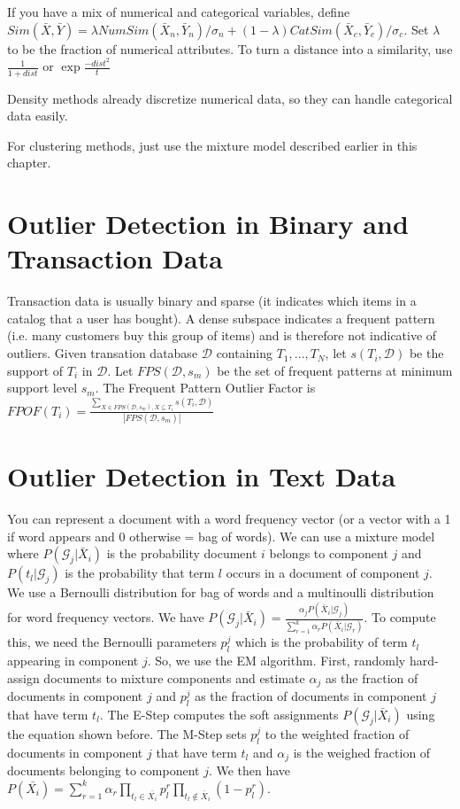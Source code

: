 \documentclass[a4paper]{article}
\begin{document}
If you have a mix of numerical and categorical variables, define
$Sim(\bar{X}, \bar{Y}) = \lambda NumSim(\bar{X}_n, \bar{Y}_n)/\sigma_n +
(1 - \lambda) CatSim(\bar{X}_c, \bar{Y}_c)/\sigma_c$.
Set $\lambda$ to be the fraction of numerical attributes. To turn a distance
into a similarity, use $\frac{1}{1 + dist}$ or $\exp{\frac{-dist^2}{t}}$

Density methods already discretize numerical data, so they can handle
categorical data easily.

For clustering methods, just use the mixture model described earlier in this
chapter.

\section{Outlier Detection in Binary and Transaction Data}
Transaction data is usually binary and sparse (it indicates which items in
a catalog that a user has bought). A dense subspace indicates a frequent
pattern (i.e. many customers buy this group of items) and is therefore not
indicative of outliers. Given transation database $\mathcal{D}$ containing
$T_1, ..., T_N$, let $s(T_i, \mathcal{D})$ be the support of $T_i$ in
$\mathcal{D}$. Let $FPS(\mathcal{D}, s_m)$ be the set of frequent patterns
at minimum support level $s_m$. The Frequent Pattern Outlier Factor is
$FPOF(T_i) = \frac{\sum_{X \in FPS(\mathcal{D}, s_m), X \subseteq T_i}{s(T_i, \mathcal{D})}}{
|FPS(\mathcal{D}, s_m)|}$

\section{Outlier Detection in Text Data}
You can represent a document with a word frequency vector (or a vector with
a 1 if word appears and 0 otherwise = bag of words).
We can use a mixture model where $P(\mathcal{G}_j | \bar{X}_i)$ is the
probability document $i$ belongs to component $j$ and $P(t_l | \mathcal{G}_j)$
is the probability that term $l$ occurs in a document of component $j$. We use
a Bernoulli distribution for bag of words and a multinoulli distribution for
word frequency vectors. We have $P(\mathcal{G}_j | \bar{X}_i) =
\frac{\alpha_j P(\bar{X}_i | \mathcal{G}_j)}{\sum_{r=1}^{k}{\alpha_r
P(\bar{X}_i | \mathcal{G}_r)}}$. To compute this, we need the Bernoulli
parameters $p^j_l$ which is the probability of term $t_l$ appearing in component
$j$. So, we use the EM algorithm. First, randomly hard-assign documents to
mixture components and estimate $\alpha_j$ as the fraction of documents in
component $j$ and $p^j_l$ as the fraction of documents in component $j$ that
have term $t_l$. The E-Step computes the soft assignments $P(\mathcal{G}_j |
\bar{X}_i)$ using the equation shown before. The M-Step sets $p_l^j$ to the
weighted fraction of documents in component $j$ that have term $t_l$ and
$\alpha_j$ is the weighed fraction of documents belonging to component $j$.
We then have $P(\bar{X_i}) = \sum_{r=1}^{k}{\alpha_r \prod_{t_l \in \bar{X_i}}{
p_l^r} \prod_{t_l \notin \bar{X}_i}{(1 - p_l^r)}}$.
\end{document}
